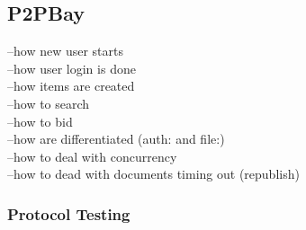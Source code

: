 \documentclass[a4paper]{article}
\begin{document}
\subsection{P2PBay}
	--how new user starts\\
    --how user login is done\\
    --how items are created\\
    --how to search\\
    --how to bid\\
    --how are differentiated (auth: and file:)\\ 
    --how to deal with concurrency\\
    --how to dead with documents timing out (republish)

\subsubsection{Protocol Testing}
\end{document}
